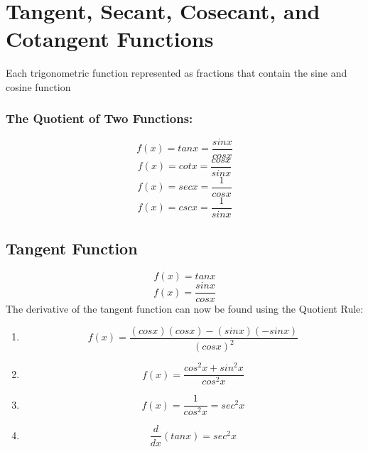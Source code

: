 \documentclass[a4paper,11pt]{book}
\begin{document}
\section{Tangent, Secant, Cosecant, and Cotangent Functions}
Each trigonometric function represented as fractions that contain the sine and cosine function

\subsubsection{The Quotient  of Two Functions:}
\LARGE 
\[ f(x) = tan x = \frac{sin x}{cos x} \]
\[ f(x) = cot x = \frac{cos x}{sin x} \]
\[ f(x) = sec x = \frac{1}{cos x} \]
\[ f(x) = csc x = \frac{1}{sin x} \]
\normalsize 











\subsection{Tangent Function}
\LARGE 
\[ f(x) = tanx \]
\[ f(x) = \frac{sinx}{cosx} \]
\normalsize 
The derivative of the tangent function can now be found using the Quotient Rule:
\LARGE 
\begin{enumerate}
  \item \[ f(x) = \frac{(cosx)(cosx)-(sinx)(-sinx)}{(cosx)^2} \]
  \item \[ f(x) = \frac{cos^2x + sin^2x}{cos^2x} \]
  \item \[ f(x) = \frac{1}{cos^2x} = sec^2x \]
  \item \[ \frac{d}{dx}(tanx) = sec^2x \]
\end{enumerate}

\normalsize 
\end{document}
